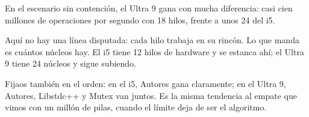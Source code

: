 En el escenario sin contención, el Ultra 9 gana con mucha diferencia: casi cien millones de operaciones por segundo con 18 hilos, frente a unos 24 del i5.

Aquí no hay una línea disputada: cada hilo trabaja en su rincón. Lo que manda es cuántos núcleos hay. El i5 tiene 12 hilos de hardware y se estanca ahí; el Ultra 9 tiene 24 núcleos y sigue subiendo.

Fijaos también en el orden: en el i5, Autores gana claramente; en el Ultra 9, Autores, Libstdc++ y Mutex van juntos. Es la misma tendencia al empate que vimos con un millón de pilas, cuando el límite deja de ser el algoritmo.
